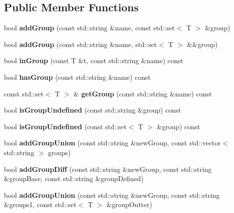 \subsection*{Public Member Functions}
\begin{DoxyCompactItemize}
\item 
\mbox{\label{classx2_1_1_f_a_groups_a0c6b1e7746fd561a386655d972e80b6c}} 
bool {\bfseries add\+Group} (const std\+::string \&name, const std\+::set$<$ T $>$ \&group)
\item 
\mbox{\label{classx2_1_1_f_a_groups_a3d84f81aa2a8f1e3c070e2e7e564b638}} 
bool {\bfseries add\+Group} (const std\+::string \&name, std\+::set$<$ T $>$ \&\&group)
\item 
\mbox{\label{classx2_1_1_f_a_groups_a23f88d7b2340e3135b2d3c66d8c330f5}} 
bool {\bfseries in\+Group} (const T \&t, const std\+::string \&name) const
\item 
\mbox{\label{classx2_1_1_f_a_groups_ac71065a983c8e48c47065769214b2da6}} 
bool {\bfseries has\+Group} (const std\+::string \&name) const
\item 
\mbox{\label{classx2_1_1_f_a_groups_a36d6e1c69dfa5f5dad26d3e9243807e9}} 
const std\+::set$<$ T $>$ \& {\bfseries get\+Group} (const std\+::string \&name) const
\item 
\mbox{\label{classx2_1_1_f_a_groups_a7bbfea3b525be2c654251497eeaa76bb}} 
bool {\bfseries is\+Group\+Undefined} (const std\+::string \&group) const
\item 
\mbox{\label{classx2_1_1_f_a_groups_a50f9de5cd5023c9b6320ad5dd1a03a22}} 
bool {\bfseries is\+Group\+Undefined} (const std\+::set$<$ T $>$ \&group) const
\item 
\mbox{\label{classx2_1_1_f_a_groups_af9d56e53d92a1e11b0a2bf1a9991bbe5}} 
bool {\bfseries add\+Group\+Union} (const std\+::string \&new\+Group, const std\+::vector$<$ std\+::string $>$ groups)
\item 
\mbox{\label{classx2_1_1_f_a_groups_a2a398b4a8151c3c54b6db40dfb8298ee}} 
bool {\bfseries add\+Group\+Diff} (const std\+::string \&new\+Group, const std\+::string \&group\+Base, const std\+::string \&group\+Defined)
\item 
\mbox{\label{classx2_1_1_f_a_groups_a37bfd53df1493cb777387d8f09aaf112}} 
bool {\bfseries add\+Group\+Union} (const std\+::string \&new\+Group, const std\+::string \&groups1, const std\+::set$<$ T $>$ \&group\+Outter)
\end{DoxyCompactItemize}
